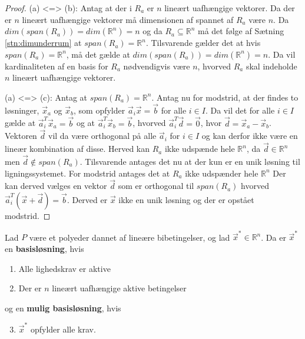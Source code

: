 \begin{proof}
	(a) <=> (b): Antag at der i $R_a$ er $n$ lineært uafhængige vektorer. Da der er $n$ lineært uafhængige vektorer må dimensionen af spannet af $R_a$ være $n$. Da $dim(span(R_a))=dim(\mathds{R}^n)=n$ og da $R_a \subseteq \mathds{R}^n$ må det følge af Sætning \ref{stn:dimunderrum} at $span(R_a)=\mathds{R}^n$. Tilsvarende gælder det at hvis $span(R_a)=\mathds{R}^n$, må det gælde at $dim(span(R_a))=dim(\mathds{R}^n)=n$. Da vil kardinaliteten af en basis for $R_a$ nødvendigvis være $n$, hvorved $R_a$ skal indeholde $n$ lineært uafhængige vektorer.


(a) <=> (c): Antag at $span(R_a)=\mathds{R}^n$. Antag nu for modstrid, at der findes to løsninger, $\vec{x}_a$ og $\vec{x}_b$, som opfylder $\vec{a}_i\vec{x}=\vec{b}$ for alle $i \in I$. 
Da vil det for alle $i \in I$ gælde at $\vec{a}_i^T\vec{x}_a=\vec{b}$ og at $\vec{a}_i^T\vec{x}_b=\vec{b}$, hvorved $\vec{a}_i^T\vec{d}=\vec{0}$, hvor $\vec{d}=\vec{x}_a-\vec{x}_b$. 
Vektoren $\vec{d}$ vil da være orthogonal på alle $\vec{a}_i$ for $i \in I$ og kan derfor ikke være en lineær kombination af disse. Herved kan $R_a$ ikke udspænde hele $\mathds{R}^n$, da $\vec{d} \in \mathds{R}^n$ men $\vec{d} \notin span(R_a)$.
Tilsvarende antages det nu at der kun er en unik løsning til ligningssystemet. For modstrid antages det at $R_a$ ikke udspænder hele $\mathds{R}^n$ Der kan derved vælges en vektor $\vec{d}$ som er orthogonal til $span(R_a)$ hvorved $\vec{a}_i^T(\vec{x}+\vec{d})=\vec{b}$. Derved er $\vec{x}$ ikke en unik løsning og der er opstået modstrid.
\end{proof}
	


\begin{defn}[Basisløsning]
Lad $P$ være et polyeder dannet af lineære bibetingelser, og lad $\vec{x}^*\in \mathds{R}^n$. Da er $\vec{x}^*$ en \textbf{basisløsning}, hvis
\begin{enumerate}[label=(\alph*)]
\item Alle lighedskrav er aktive
\item Der er $n$ lineært uafhængige aktive betingelser
\end{enumerate}
og en \textbf{mulig basisløsning}, hvis
\begin{enumerate}[label=(\alph*)]
\setcounter{enumi}{2}
\item $\vec{x}^*$ opfylder alle krav.
\end{enumerate}
\label{def:basislosning}
\end{defn}

